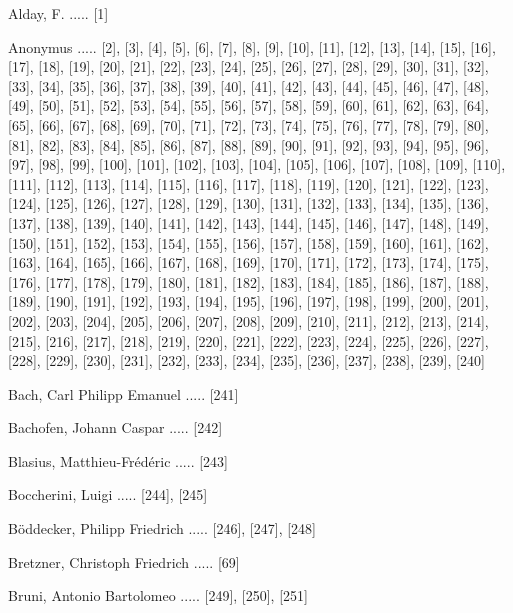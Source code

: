\documentclass[twocolumn]{book}
\begin{document}
\newline 
Alday, F. ..... [1]

\newline 
Anonymus ..... [2], [3], [4], [5], [6], [7], [8], [9], [10], [11], [12], [13], [14], [15], [16], [17], [18], [19], [20], [21], [22], [23], [24], [25], [26], [27], [28], [29], [30], [31], [32], [33], [34], [35], [36], [37], [38], [39], [40], [41], [42], [43], [44], [45], [46], [47], [48], [49], [50], [51], [52], [53], [54], [55], [56], [57], [58], [59], [60], [61], [62], [63], [64], [65], [66], [67], [68], [69], [70], [71], [72], [73], [74], [75], [76], [77], [78], [79], [80], [81], [82], [83], [84], [85], [86], [87], [88], [89], [90], [91], [92], [93], [94], [95], [96], [97], [98], [99], [100], [101], [102], [103], [104], [105], [106], [107], [108], [109], [110], [111], [112], [113], [114], [115], [116], [117], [118], [119], [120], [121], [122], [123], [124], [125], [126], [127], [128], [129], [130], [131], [132], [133], [134], [135], [136], [137], [138], [139], [140], [141], [142], [143], [144], [145], [146], [147], [148], [149], [150], [151], [152], [153], [154], [155], [156], [157], [158], [159], [160], [161], [162], [163], [164], [165], [166], [167], [168], [169], [170], [171], [172], [173], [174], [175], [176], [177], [178], [179], [180], [181], [182], [183], [184], [185], [186], [187], [188], [189], [190], [191], [192], [193], [194], [195], [196], [197], [198], [199], [200], [201], [202], [203], [204], [205], [206], [207], [208], [209], [210], [211], [212], [213], [214], [215], [216], [217], [218], [219], [220], [221], [222], [223], [224], [225], [226], [227], [228], [229], [230], [231], [232], [233], [234], [235], [236], [237], [238], [239], [240]

\newline 
Bach, Carl Philipp Emanuel ..... [241]

\newline 
Bachofen, Johann Caspar ..... [242]

\newline 
Blasius, Matthieu-Frédéric ..... [243]

\newline 
Boccherini, Luigi ..... [244], [245]

\newline 
Böddecker, Philipp Friedrich ..... [246], [247], [248]

\newline 
Bretzner, Christoph Friedrich ..... [69]

\newline 
Bruni, Antonio Bartolomeo ..... [249], [250], [251]
\end{document}

